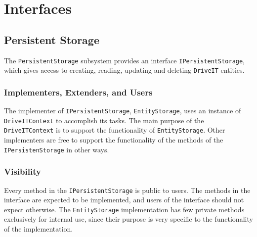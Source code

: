 \section{Interfaces}

\subsection{Persistent Storage}
The \texttt{PersistentStorage} subsystem provides an interface \texttt{IPersistentStorage}, which gives access to creating, reading, updating and deleting \texttt{DriveIT} entities. 

\subsubsection{Implementers, Extenders, and Users}
The implementer of \texttt{IPersistentStorage}, \texttt{EntityStorage}, uses an instance of \texttt{DriveITContext} to accomplish its tasks. The main purpose of the \texttt{DriveITContext} is to support the functionality of \texttt{EntityStorage}. Other implementers are free to support the functionality of the methods of the \texttt{IPersistenStorage} in other ways. 

\subsubsection{Visibility}
Every method in the \texttt{IPersistentStorage} is public to users. The methods in the interface are expected to be implemented, and users of the interface should not expect otherwise.
The \texttt{EntityStorage} implementation has few private methods exclusively for internal use, since their purpose is very specific to the functionality of the implementation.